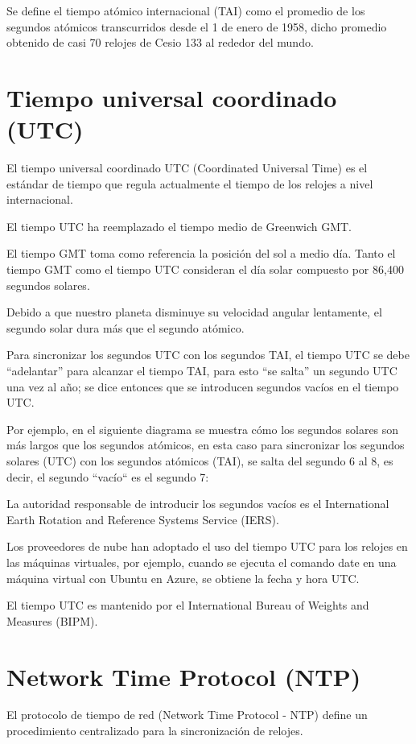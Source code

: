 Se define el tiempo atómico internacional (TAI) como el promedio de los segundos atómicos transcurridos desde el 1 de enero de 1958, dicho promedio obtenido de casi 70 relojes de Cesio 133 al rededor del mundo.

\section{Tiempo universal coordinado (UTC)}

El tiempo universal coordinado UTC (Coordinated Universal Time) es el estándar de tiempo que regula actualmente el tiempo de los relojes a nivel internacional.

El tiempo UTC ha reemplazado el tiempo medio de Greenwich GMT.

El tiempo GMT toma como referencia la posición del sol a medio día. Tanto el tiempo GMT como el tiempo UTC consideran el día solar compuesto por 86,400 segundos solares.

Debido a que nuestro planeta disminuye su velocidad angular lentamente, el segundo solar dura más que el segundo atómico.

Para sincronizar los segundos UTC con los segundos TAI, el tiempo UTC se debe “adelantar” para alcanzar el tiempo TAI, para esto “se salta” un segundo UTC una vez al año; se dice entonces que se introducen segundos vacíos en el tiempo UTC.

Por ejemplo, en el siguiente diagrama se muestra cómo los segundos solares son más largos que los segundos atómicos, en esta caso para sincronizar los segundos solares (UTC) con los segundos atómicos (TAI), se salta del segundo 6 al 8, es decir, el segundo ``vacío`` es el segundo 7:

La autoridad responsable de introducir los segundos vacíos es el International Earth Rotation and Reference Systems Service (IERS).

Los proveedores de nube han adoptado el uso del tiempo UTC para los relojes en las máquinas virtuales, por ejemplo, cuando se ejecuta el comando date en una máquina virtual con Ubuntu en Azure, se obtiene la fecha y hora UTC.

El tiempo UTC es mantenido por el International Bureau of Weights and Measures (BIPM).

\section{Network Time Protocol (NTP)}

El protocolo de tiempo de red (Network Time Protocol - NTP) define un procedimiento centralizado para la sincronización de relojes.

